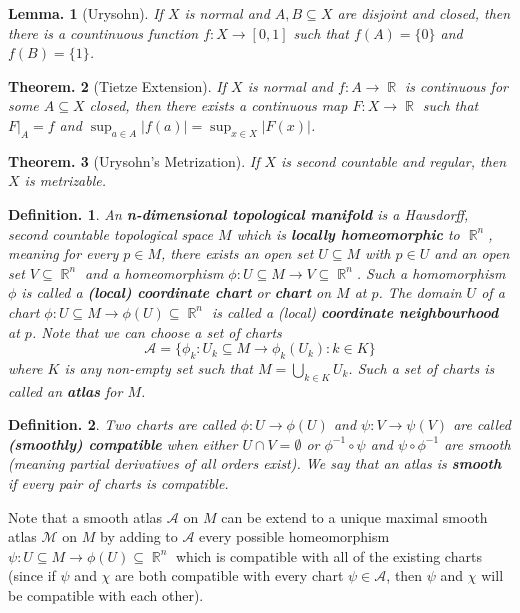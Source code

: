 \documentclass[11pt, a4paper]{memoir}
\DeclareMathOperator{\R}{{\mathbb{R}}}
\theoremstyle{change}
\newtheorem{theorem}{Theorem.}[section]
\newtheorem{lemma}[theorem]{Lemma.}
\theoremstyle{plain}
\theoremstyle{nonumberplain}
\newtheorem{definition}{Definition.}
\numberwithin{equation}{section}
\begin{document}
\begin{lemma}[Urysohn]
    If $X$ is normal and $A,B\subseteq X$ are disjoint and closed, then there is a countinuous function $f:X\to[0,1]$ such that $f(A)=\{0\}$ and $f(B)=\{1\}$.
\end{lemma}
\begin{theorem}[Tietze Extension]
    If $X$ is normal and $f:A\to\R$ is continuous for some $A\subseteq X$ closed, then there exists a continuous map $F:X\to\R$ such that $F|_A=f$ and $\sup_{a\in A}|f(a)|=\sup_{x\in X}|F(x)|$.
\end{theorem}
\begin{theorem}[Urysohn's Metrization]
    If $X$ is second countable and regular, then $X$ is metrizable.
\end{theorem}
\begin{definition}
    An \textbf{n-dimensional topological manifold} is a Hausdorff, second countable topological space $M$ which is \textbf{locally homeomorphic} to $\R^n$, meaning for every $p\in M$, there exists an open set $U\subseteq M$ with $p\in U$ and an open set $V\subseteq\R^n$ and a homeomorphism $\phi:U\subseteq M\to V\subseteq\R^n$.
    Such a homomorphism $\phi$ is called a \textbf{(local) coordinate chart} or \textbf{chart} on $M$ at $p$.
    The domain $U$ of a chart $\phi:U\subseteq M\to\phi(U)\subseteq\R^n$ is called a (local) \textbf{coordinate neighbourhood} at $p$.
    Note that we can choose a set of charts
    \begin{equation*}
        \mathcal{A}=\{\phi_k:U_k\subseteq M\to\phi_k(U_k) : k\in K\}
    \end{equation*}
    where $K$ is any non-empty set such that $M=\bigcup_{k\in K}U_k$.
    Such a set of charts is called an \textbf{atlas} for $M$.
\end{definition}
\begin{definition}
    Two charts are called $\phi:U\to\phi(U)$ and $\psi:V\to\psi(V)$ are called \textbf{(smoothly) compatible} when either $U\cap V=\emptyset$ or $\phi^{-1}\circ\psi$ and $\psi\circ\phi^{-1}$ are smooth (meaning partial derivatives of all orders exist).
    We say that an atlas is \textbf{smooth} if every pair of charts is compatible.
\end{definition}
Note that a smooth atlas $\mathcal{A}$ on $M$ can be extend to a unique maximal smooth atlas $\mathcal{M}$ on $M$ by adding to $\mathcal{A}$ every possible homeomorphism $\psi:U\subseteq M\to\phi(U)\subseteq\R^n$ which is compatible with all of the existing charts (since if $\psi$ and $\chi$ are both compatible with every chart $\psi\in\mathcal{A}$, then $\psi$ and $\chi$ will be compatible with each other).
\end{document}

